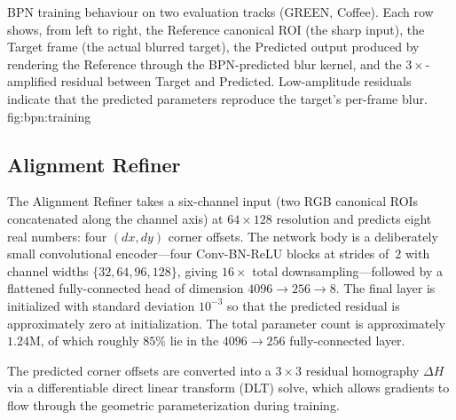 %
  {BPN training behaviour on two evaluation tracks (GREEN, Coffee).
   Each row shows, from left to right, the Reference canonical ROI
   (the sharp input), the Target frame (the actual blurred target),
   the Predicted output produced by rendering the Reference through
   the BPN-predicted blur kernel, and the $3\times$-amplified
   residual between Target and Predicted. Low-amplitude residuals
   indicate that the predicted parameters reproduce the target's
   per-frame blur.}%
  {fig:bpn:training}

\subsection{Alignment Refiner}
\label{sec:method:refiner}

The Alignment Refiner takes a six-channel input (two RGB canonical
ROIs concatenated along the channel axis) at $64\times 128$
resolution and predicts eight real numbers: four $(dx, dy)$ corner
offsets. The network body is a deliberately small convolutional
encoder---four Conv-BN-ReLU blocks at strides of~$2$ with channel
widths $\{32, 64, 96, 128\}$, giving $16\times$ total
downsampling---followed by a flattened fully-connected head of
dimension $4096 \rightarrow 256 \rightarrow 8$. The final layer is
initialized with standard deviation $10^{-3}$ so that the
predicted residual is approximately zero at initialization. The
total parameter count is approximately $1.24$M, of which roughly
$85\%$ lie in the $4096 \rightarrow 256$ fully-connected layer.

The predicted corner offsets are converted into a $3\times 3$
residual homography $\Delta H$ via a differentiable direct linear
transform (DLT) solve, which allows gradients to flow through the
geometric parameterization during training.

